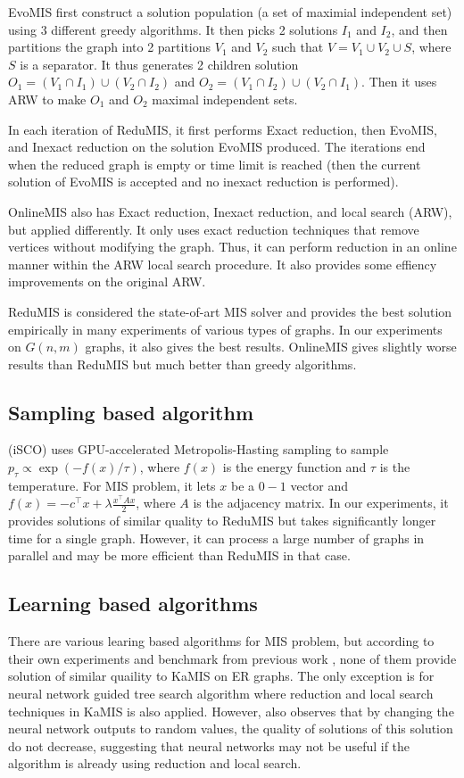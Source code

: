 EvoMIS first construct a solution population (a set of maximial independent set) using $3$ different greedy algorithms. It then picks 2 solutions $I_1$ and $I_2$, and then partitions the graph into 2 partitions $V_1$ and $V_2$ such that $V = V_1 \cup V_2 \cup S$, where $S$ is a separator. It thus generates 2 children solution $O_1 = (V_1 \cap I_1) \cup (V_2 \cap I_2)$ and $O_2 = (V_1 \cap I_2) \cup (V_2 \cap I_1)$. Then it uses ARW to make $O_1$ and $O_2$ maximal independent sets.

In each iteration of ReduMIS, it first performs Exact reduction, then EvoMIS, and Inexact reduction on the solution EvoMIS produced. The iterations end when the reduced graph is empty or time limit is reached (then the current solution of EvoMIS is accepted and no inexact reduction is performed).

OnlineMIS also has Exact reduction, Inexact reduction, and local search (ARW), but applied differently. It only uses exact reduction techniques that remove vertices without modifying the graph. Thus, it can perform reduction in an online manner within the ARW local search procedure. It also provides some effiency improvements on the original ARW.

ReduMIS is considered the state-of-art MIS solver and provides the best solution empirically in many experiments of various types of graphs. In our experiments on $G(n,m)$ graphs, it also gives the best results. OnlineMIS gives slightly worse results than ReduMIS but much better than greedy algorithms.

\subsection{Sampling based algorithm}
\cite{sun2023revisiting} (iSCO) uses GPU-accelerated Metropolis-Hasting sampling to sample $p_{\tau} \propto \exp\left(-f(x)/\tau\right)$, where $f(x)$ is the energy function and $\tau$ is the temperature. For MIS problem, it lets $x$ be a $0-1$ vector and  $f(x) = -c^\top x + \lambda \frac{x^\top A x}{2}$, where $A$ is the adjacency matrix. In our experiments, it provides solutions of similar quality to ReduMIS but takes significantly longer time for a single graph. However, it can process a large number of graphs in parallel and may be more efficient than ReduMIS in that case.

\subsection{Learning based algorithms}
There are various learing based algorithms for MIS problem, but according to their own experiments and benchmark from previous work \cite{boether_dltreesearch_2022}, none of them provide solution of similar quaility to KaMIS on ER graphs. The only exception is for neural network guided tree search algorithm \cite{li2018combinatorial} where reduction and local search techniques in KaMIS is also applied. However, \cite{boether_dltreesearch_2022} also observes that by changing the neural network outputs to random values, the quality of solutions of this solution do not decrease, suggesting that neural networks may not be useful if the algorithm is already using reduction and local search. 

